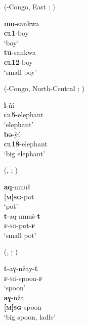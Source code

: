\documentclass[output=collectionpaper]{langsci/langscibook}
\begin{document}
\ea\label{ex:WDG:32}
 (-Congo, East ; \citealt[21]{Carter2002})\\
\begin{xlist}
\ex
\gll	\textbf{mu}-sankwa \\
	\textbf{\textsc{cl1}}-boy \\
\glt	`boy'\\
\ex
\gll \textbf{tu}-sankwa	\\
	\textbf{\textsc{cl}12}-boy \\
\glt	`small boy' \\
\end{xlist}
\z

\ea\label{ex:WDG:33}
 (-Congo, North-Central ; \citealt[160]{Santos1996}) \\
\begin{xlist}
\ex
\gll	\textbf{ì}-ñí \\
	\textbf{\textsc{cl}5}-elephant \\
\glt 	`elephant' \\
\ex
\gll 	\textbf{bə}-ỹí \\
	\textbf{\textsc{cl}18}-elephant\\
\glt	`big elephant' \\
\end{xlist}
\z

\ea\label{ex:WDG:34}
 (, ; \citealt[12]{Penchoen1973a})  \\
\begin{xlist}
\ex
\gll \textbf{aq}-nmuš \\
	\textbf{\textsc{[m]sg}}-pot \\
\glt	`pot' \\
\ex
\gll	\textbf{t}-aq-nmuš-\textbf{t} \\
	\textsc{\textbf{f}-sg}-pot-\textbf{\textsc{f}} \\
\glt  	`small pot' \\
\end{xlist}
\z

\ea\label{ex:WDG:35}
 (, ; \citealt[12]{Penchoen1973a})\\
\begin{xlist}
\ex
\gll	\textbf{t}-aɣ-nžay-\textbf{t} \\
	\textsc{\textbf{f}-sg}-spoon-\textbf{\textsc{f}} \\
\glt	`spoon' \\
\ex
\gll 	\textbf{aɣ}-nža \\
\textbf{\textsc{[m]sg}}-spoon \\
\glt	`big spoon, ladle' \\
\end{xlist}
\z
\end{document}
